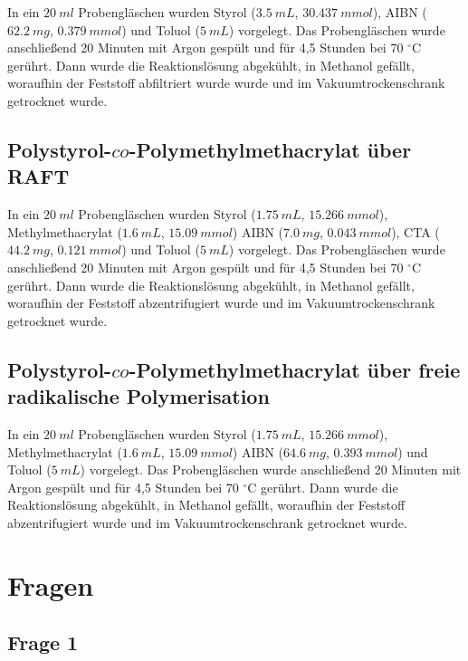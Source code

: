 \documentclass[10pt,a4paper,ngerman]{scrartcl}
\newcommand{\celsius}{^{\circ}\mathrm{C}}
\begin{document}
		In ein $\SI{20}{ml}$ Probengläschen wurden Styrol ($\SI{3,5}{mL}$, $\SI{30,437}{mmol}$), AIBN ($\SI{62,2}{mg}$, $\SI{0,379}{mmol}$) und Toluol ($\SI{5}{mL}$) 
		vorgelegt. Das Probengläschen wurde anschließend 20 Minuten mit Argon gespült und für 4,5 Stunden bei 70 $\celsius$ gerührt. Dann wurde die Reaktionslösung 
		abgekühlt, in Methanol gefällt, woraufhin der Feststoff abfiltriert wurde wurde und im Vakuumtrockenschrank getrocknet wurde.
	
	\subsection{Polystyrol-$co$-Polymethylmethacrylat über RAFT}

		In ein $\SI{20}{ml}$ Probengläschen wurden Styrol ($\SI{1,75}{mL}$, $\SI{15,266}{mmol}$), Methylmethacrylat ($\SI{1,6}{mL}$, $\SI{15,09}{mmol}$) AIBN ($\SI{7,0}{mg}$, $\SI{0,043}{mmol}$), 
		CTA ($\SI{44,2}{mg}$, $\SI{0,121}{mmol}$) und Toluol ($\SI{5}{mL}$) vorgelegt. Das Probengläschen wurde 
		anschließend 20 Minuten mit Argon gespült und für 4,5 Stunden bei 70 $\celsius$ gerührt. Dann wurde die Reaktionslösung abgekühlt, in Methanol gefällt, 
		woraufhin der Feststoff abzentrifugiert wurde und im Vakuumtrockenschrank getrocknet wurde.

	\subsection{Polystyrol-$co$-Polymethylmethacrylat über freie radikalische Polymerisation}

		In ein $\SI{20}{ml}$ Probengläschen wurden Styrol ($\SI{1,75}{mL}$, $\SI{15,266}{mmol}$), Methylmethacrylat ($\SI{1,6}{mL}$, $\SI{15,09}{mmol}$) AIBN ($\SI{64,6}{mg}$, $\SI{0,393}{mmol}$) 
		und Toluol ($\SI{5}{mL}$) vorgelegt. Das Probengläschen wurde 
		anschließend 20 Minuten mit Argon gespült und für 4,5 Stunden bei 70 $\celsius$ gerührt. Dann wurde die Reaktionslösung abgekühlt, in Methanol gefällt, 
		woraufhin der Feststoff abzentrifugiert wurde und im Vakuumtrockenschrank getrocknet wurde.
	
\section{Fragen}

	\subsection{Frage 1}
\end{document}
